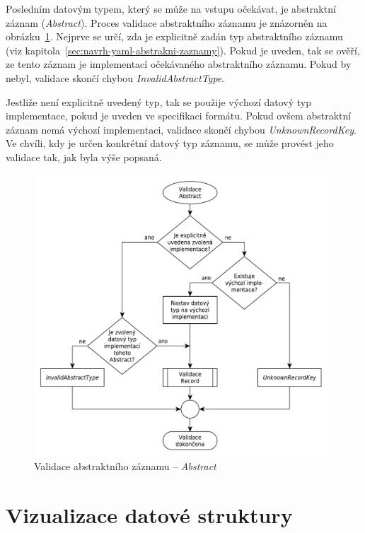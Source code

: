 \documentclass[FM,bw,DP]{tulthesis}
\begin{document}
Posledním datovým typem, který se může na vstupu očekávat, je abstraktní záznam (\textit{Abstract}). Proces validace abstraktního záznamu je znázorněn na obrázku~\ref{img:validation_abstract}. Nejprve se určí, zda je explicitně zadán typ abstraktního záznamu (viz kapitola~\ref{sec:navrh-yaml-abstrakni-zaznamy}). Pokud je uveden, tak se ověří, ze tento záznam je implementací očekávaného abstraktního záznamu. Pokud by nebyl, validace skončí chybou \textit{InvalidAbstractType}.

Jestliže není explicitně uvedený typ, tak se použije výchozí datový typ implementace, pokud je uveden ve specifikaci formátu. Pokud ovšem abstraktní záznam nemá výchozí implementaci, validace skončí chybou \textit{UnknownRecordKey}. Ve chvíli, kdy je určen konkrétní datový typ záznamu, se může provést jeho validace tak, jak byla výše popsaná.

\begin{figure}[h]
	\centering
    \includegraphics[width=0.98\textwidth]{../img/validation_abstract.pdf}
    \caption{Validace abstraktního záznamu -- \textit{Abstract}}
	\label{img:validation_abstract}
\end{figure}

\section{Vizualizace datové struktury}
\end{document}
